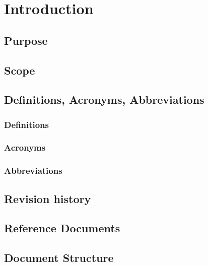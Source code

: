 \section{Introduction}

\subsection{Purpose}

\subsection{Scope}

\subsection{Definitions, Acronyms, Abbreviations}
\subsubsection{Definitions}
\subsubsection{Acronyms}
\subsubsection{Abbreviations}

\subsection{Revision history}

\subsection{Reference Documents}

\subsection{Document Structure}